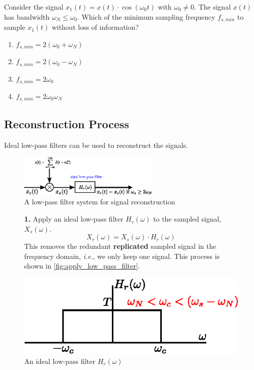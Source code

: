 \begin{q}{}
Consider the signal $x_{1}(t) = x(t) \cdot \cos(\omega_0 t)$ with $\omega_0 \neq 0$. The signal $x(t)$ has bandwidth $\omega_N \leq \omega_0$. Which of the minimum sampling frequency $f_{s, min}$ to sample $x_{1}(t)$ without loss of information?

\begin{enumerate}[label=(\alph*)]
    \item $f_{s,min} = 2(\omega_{0}+\omega_{N})$
    \item $f_{s,min} = 2(\omega_{0}-\omega_{N})$
    \item $f_{s,min} = 2\omega_{0}$
    \item $f_{s,min} = 2\omega_{0}\omega_{N}$
\end{enumerate}
\end{q}

\subsection{Reconstruction Process}
Ideal low-pass filters can be used to reconstruct the signals.
\begin{figure}[H]
    \centering
    \includegraphics[width = 0.6\textwidth]{images/low_pass_block_diag.eps}
    \caption{A low-pass filter system for signal reconstruction} 
\end{figure}

\begin{figure}[H]
\begin{minipage}{0.55\textwidth}
\textbf{1.} Apply an ideal low-pass filter $H_{r}(\omega)$ to the sampled signal, $X_{s}(\omega)$.
\[ X_{r}(\omega) = X_{s}(\omega) \cdot H_{r}(\omega) \]
This removes the redundant \textbf{replicated} sampled signal in the frequency domain, \textit{i.e.}, we only keep one signal. This process is shown in \autoref{fig:apply_low_pass_filter}.
\end{minipage} \hspace{.5cm}
\begin{minipage}{0.5\textwidth}
\includegraphics[width = \textwidth]{images/low_pass_filter.eps}
\caption{An ideal low-pass filter $H_{r}(\omega)$}
\end{minipage}
\end{figure}

